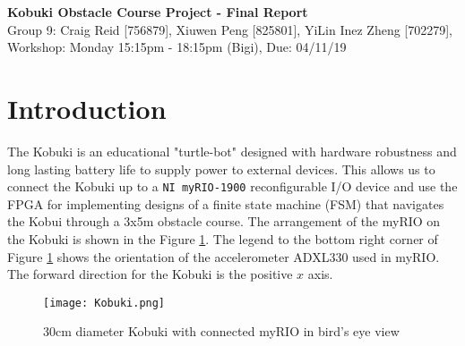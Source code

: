 \documentclass[11pt]{article}
\begin{document}

\begin{center}
\textbf{\Large{Kobuki Obstacle Course Project - Final Report}}\\
Group 9: Craig Reid [756879], Xiuwen Peng [825801], YiLin Inez Zheng [702279], \\
Workshop: Monday 15:15pm - 18:15pm (Bigi), Due: 04/11/19  
\end{center}


\section{Introduction}
The Kobuki is an educational "turtle-bot" designed with hardware robustness and long lasting battery life to supply power to external devices. This allows us to connect the Kobuki up to a \texttt{NI myRIO-1900} reconfigurable I/O device and use the FPGA for implementing designs of a finite state machine (FSM) that navigates the Kobui through a 3x5m obstacle course. The arrangement of the myRIO on the Kobuki is shown in the Figure \ref{fig:kobuki}. The legend to the bottom right corner of Figure \ref{fig:kobuki} shows the orientation of the accelerometer ADXL330 used in myRIO. The forward direction for the Kobuki is the positive $x$ axis. 
\begin{figure}[H]
    \centering
    \texttt{[image: Kobuki.png]}
    \caption{30cm diameter Kobuki with connected myRIO in bird's eye view}
    \label{fig:kobuki}
\end{figure}
\end{document}
